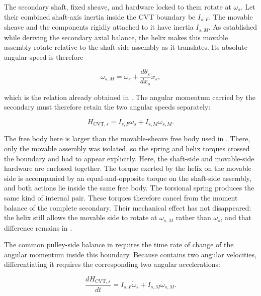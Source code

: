 \documentclass[11pt]{report}
\numberwithin{equation}{section}
\begin{document}
The secondary shaft, fixed sheave, and hardware locked to them rotate at
\(\omega_s\). Let their combined shaft-axis inertia inside the CVT boundary be
\(I_{s,F}\). The movable sheave and the components rigidly attached to it have
inertia \(I_{s,M}\). As established while deriving the secondary axial balance,
the helix makes this movable assembly rotate relative to the shaft-side
assembly as it translates. Its absolute angular speed is therefore

\begin{equation}
    \omega_{s,M}
    =
    \omega_s
    +
    \frac{d\theta_s}{dx_s}\dot x_s,
    \label{eq:secondary_movable_sheave_speed_recalled}
\end{equation}

which is the relation already obtained in
. The angular momentum carried by the
secondary must therefore retain the two angular speeds separately:

\begin{equation}
    H_{\mathrm{CVT},s}
    =
    I_{s,F}\omega_s
    +
    I_{s,M}\omega_{s,M}.
    \label{eq:secondary_pulley_angular_momentum}
\end{equation}

The free body here is larger than the movable-sheave free body used in
. There, only the movable assembly was
isolated, so the spring and helix torques crossed the boundary and had to
appear explicitly. Here, the shaft-side and movable-side hardware are enclosed
together. The torque exerted by the helix on the movable side is accompanied
by an equal-and-opposite torque on the shaft-side assembly, and both actions
lie inside the same free body. The torsional spring produces the same kind of
internal pair. These torques therefore cancel from the moment balance of the
complete secondary. Their mechanical effect has not disappeared: the helix
still allows the movable side to rotate at \(\omega_{s,M}\) rather than
\(\omega_s\), and that difference remains in
.

The common pulley-side balance in
 requires the time rate of
change of the angular momentum inside this boundary. Because
 contains two angular velocities,
differentiating it requires the corresponding two angular accelerations:

\begin{equation}
    \frac{dH_{\mathrm{CVT},s}}{dt}
    =
    I_{s,F}\dot\omega_s
    +
    I_{s,M}\dot\omega_{s,M}.
    \label{eq:secondary_pulley_angular_momentum_rate_unmapped}
\end{equation}
\end{document}
